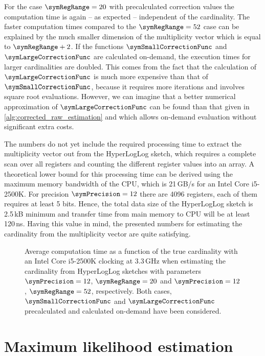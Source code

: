 \documentclass[a4paper]{scrartcl}
\begin{document}
For the case $\symRegRange=20$ with precalculated correction values the computation time is again -- as expected -- independent of the cardinality. The faster computation times compared to the $\symRegRange=52$ case can be explained by the much smaller dimension of the multiplicity vector which is equal to $\symRegRange+2$. If the functions $\symSmallCorrectionFunc$ and $\symLargeCorrectionFunc$ are calculated on-demand, the execution times for larger cardinalities are doubled. This comes from the fact that the calculation of $\symLargeCorrectionFunc$ is much more expensive than that of $\symSmallCorrectionFunc$, because it requires more iterations and involves square root evaluations. However, we can imagine that a better numerical approximation of $\symLargeCorrectionFunc$ can be found than that given in \cref{alg:corrected_raw_estimation} and which allows on-demand evaluation without significant extra costs.

The numbers do not yet include the required processing time to extract the multiplicity vector out from the HyperLogLog sketch, which requires a complete scan over all registers and counting the different register values into an array. A theoretical lower bound for this processing time can be derived using the maximum memory bandwidth of the CPU, which is 21\,GB/s for an Intel Core i5-2500K. For precision $\symPrecision=12$ there are 4096 registers, each of them requires at least 5 bits. Hence, the total data size of the HyperLogLog sketch is 2.5\,kB minimum and transfer time from main memory to CPU will be at least 120\,ns. Having this value in mind, the presented numbers for estimating the cardinality from the multiplicity vector are quite satisfying. 

\begin{figure}
\centering

\caption{Average computation time as a function of the true cardinality with an Intel Core i5-2500K clocking at 3.3\,GHz when estimating the cardinality from HyperLogLog sketches with parameters $\symPrecision=12$, $\symRegRange=20$ and $\symPrecision=12$, $\symRegRange=52$, respectively. Both cases, $\symSmallCorrectionFunc$ and $\symLargeCorrectionFunc$ precalculated and calculated on-demand have been considered.}
\label{fig:corrected_raw_avg_exec_time}
\end{figure}

\section{Maximum likelihood estimation}
\end{document}
